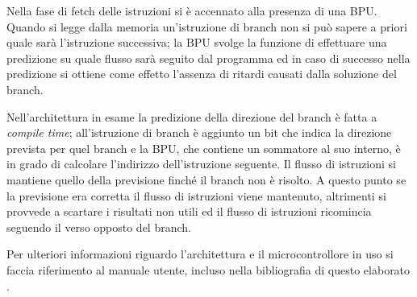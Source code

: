 Nella fase di fetch delle istruzioni si è accennato alla presenza di una BPU. Quando si legge dalla memoria un'istruzione di branch non si può sapere a priori quale sarà l'istruzione successiva; la BPU svolge la funzione di effettuare una predizione su quale flusso sarà seguito dal programma ed in caso di successo nella predizione si ottiene come effetto l'assenza di ritardi causati dalla soluzione del branch.

Nell'architettura in esame la predizione della direzione del branch è fatta a \textit{compile time}; all'istruzione di branch è aggiunto un bit che indica la direzione prevista per quel branch e la BPU, che contiene un sommatore al suo interno, è in grado di calcolare l'indirizzo dell'istruzione seguente. Il flusso di istruzioni si mantiene quello della previsione finché il branch non è risolto. A questo punto se la previsione era corretta il flusso di istruzioni viene mantenuto, altrimenti si provvede a scartare i risultati non utili ed il flusso di istruzioni ricomincia seguendo il verso opposto del branch.

Per ulteriori informazioni riguardo l'architettura e il microcontrollore in uso si faccia riferimento al manuale utente, incluso nella bibliografia di questo elaborato \cite{e300manual}.










